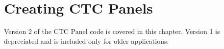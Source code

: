 
\chapter{Creating CTC Panels}
\label{chapt:CTCPanels}

Version 2 of the CTC Panel code is covered in this chapter.  Version 1
is depreciated and is included only for older applications.

